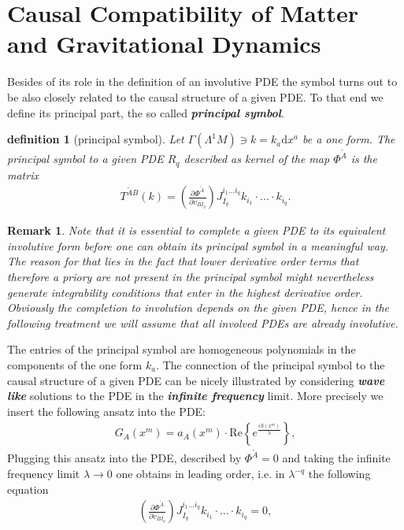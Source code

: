 \documentclass[a4paper,12pt, DIV=14, BCOR=5mm, twoside, headsepline]{scrbook}
\newtheorem{definition}{definition}[section]
\newtheorem*{remark}{Remark}
\begin{document}
\section{Causal Compatibility of Matter and Gravitational Dynamics}
Besides of its role in the definition of an involutive PDE the symbol turns out to be also closely related to the causal structure of a given PDE. To that end we define its principal part, the so called \textbf{\textit{principal symbol}}.
\begin{definition}[principal symbol] \label{PSym}
Let $\Gamma(\Lambda^1M) \ni k = k_{a} \mathrm{d}x^a$ be a one form. The principal symbol to a given PDE $R_q$ described as kernel of the map $\Phi^{\tilde{A}}$ is the matrix
\begin{align}
    T^{\tilde{A} B}(k) = \left ( \frac{\partial \Phi^{\tilde{A}}}{\partial v_{BI_q}} \right ) J_{I_q}^{i_1...i_q} k_{i_1} \cdot ... \cdot k_{i_q}.
\end{align}
\end{definition}
\begin{remark}
Note that it is essential to complete a given PDE to its equivalent involutive form before one can obtain its principal symbol in  a meaningful way. The reason for that lies in the fact that lower derivative order terms that therefore a priory are not present in the principal symbol might nevertheless generate integrability conditions that enter in the highest derivative order. Obviously the completion to involution depends on the given PDE, hence in the following treatment we will assume that all involved PDEs are already involutive.
\end{remark}
The entries of the principal symbol are homogeneous polynomials in the components of the one form $k_a$.
The connection of the principal symbol to the causal structure of a given PDE can be nicely illustrated by considering \textit{\textbf{wave like}} solutions to the PDE in the \textit{\textbf{infinite frequency}} limit. 
More precisely we insert the following ansatz into the PDE:
\begin{align}\label{waveAns}
    G_A(x^m) = a_A(x^m) \cdot \mathrm{Re}\left \{ e^{\frac{iS(x^m)}{\lambda}} \right \},
\end{align}
Plugging this ansatz into the PDE, described by $\Phi^{\tilde{A}}=0$ and taking the infinite frequency limit $\lambda \rightarrow 0$ one obtains in leading order, i.e. in $\lambda^{-q}$ the following equation
\begin{align}
    \left ( \frac{\partial \Phi^{\tilde{A}}}{\partial v_{BI_q}} \right ) J_{I_q}^{i_1...i_q} k_{i_1} \cdot ... \cdot k_{i_q} = 0,
\end{align}
\end{document}
